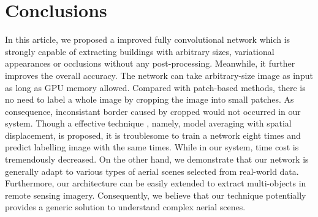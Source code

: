 \documentclass[runningheads]{llncs}
\begin{document}
\section{Conclusions}
\label{section:conclusions}
   In  this article, we proposed a improved fully convolutional network which is strongly capable of extracting buildings with arbitrary sizes, variational appearances or occlusions without any post-processing. Meanwhile, it further improves the overall accuracy. The network can take arbitrary-size image as input as long as GPU memory allowed. Compared with patch-based methods, there is no need to label a whole image by cropping the image into small patches. As consequence, inconsistant border caused by cropped would not occurred in our system. Though a effective technique \cite{Saito2016Multiple}, namely, model averaging with spatial displacement, is proposed, it is troublesome to train a network eight times and predict labelling image with the same times. While in our system, time cost is tremendously decreased. On the other hand, we demonstrate that our network  is generally adapt to various types of aerial scenes selected from real-world data. Furthermore, our architecture can be easily extended to extract multi-objects in remote sensing imagery. Consequently, we believe that our technique potentially provides a generic solution to understand complex aerial scenes.
	



\end{document}
